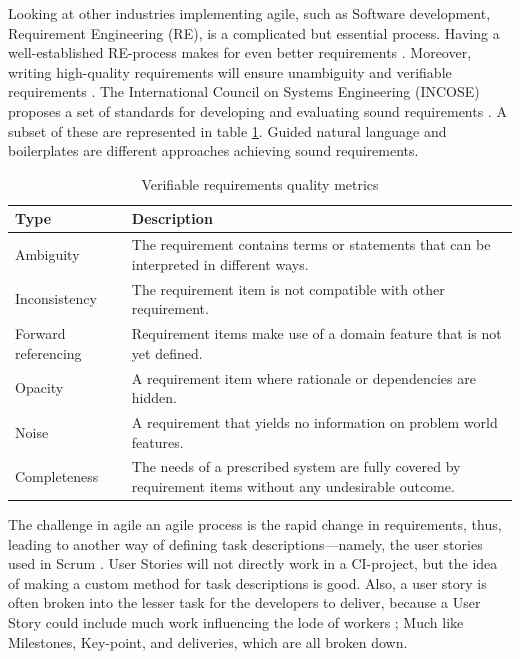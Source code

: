 Looking at other industries implementing agile, such as Software development, Requirement Engineering (RE), is a complicated but essential process. Having a well-established RE-process makes for even better requirements \cite{pandey2010effective}. Moreover, writing high-quality requirements will ensure unambiguity and verifiable requirements \cite{carson2015implementing}. The International Council on Systems Engineering (INCOSE) proposes a set of standards for developing and evaluating sound requirements \cite{incose2015guide}. A subset of these are represented in table \ref{tab:requirement_quality}. Guided natural language \cite{rolland1992natural} and boilerplates \cite{daramola2012pattern} are different approaches achieving sound requirements.

\begin{table}
    \begin{tabular}{@{}lp{9cm}}
    \toprule
    \textbf{Type}       & \textbf{Description}                                                                                                         \\ \midrule
    Ambiguity           & The requirement contains terms or statements that can be interpreted in different ways.                                      \\
    Inconsistency       & The requirement item is not compatible with other requirement.\\
    Forward referencing & Requirement items make use of a domain feature that is not yet defined.                                                      \\
    Opacity             & A requirement item where rationale or dependencies are hidden.                                                               \\
    Noise               & A requirement that yields no information on problem world features.                                                          \\
    Completeness        & The needs of a prescribed system are fully covered by requirement items without any undesirable outcome.                     \\ \bottomrule
    \end{tabular}
    \caption{Verifiable requirements quality metrics \cite{incose2015guide}}
    \label{tab:requirement_quality}
\end{table}

The challenge in agile an agile process is the rapid change in requirements, thus, leading to another way of defining task descriptions—namely, the user stories used in Scrum \cite{sutherland}. User Stories will not directly work in a CI-project, but the idea of making a custom method for task descriptions is good. Also, a user story is often broken into the lesser task for the developers to deliver, because a User Story could include much work influencing the lode of workers \cite{liskin2014we}; Much like Milestones, Key-point, and deliveries, which are all broken down.

